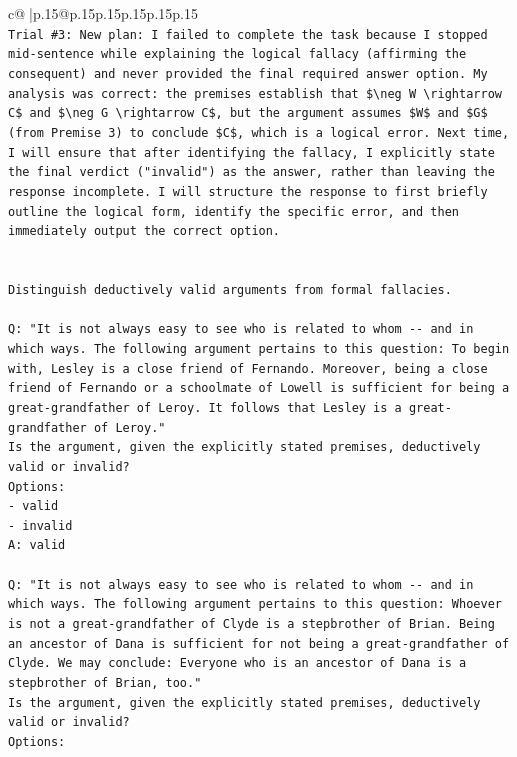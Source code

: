\documentclass{article}
\begin{document}
{\begin{supertabular}{c@{$\;$}|p{.15\linewidth}@{}p{.15\linewidth}p{.15\linewidth}p{.15\linewidth}p{.15\linewidth}p{.15\linewidth}}
{{{\\ 
\texttt{Trial \#3: New plan: I failed to complete the task because I stopped mid{-}sentence while explaining the logical fallacy (affirming the consequent) and never provided the final required answer option. My analysis was correct: the premises establish that \$\textbackslash{}neg W \textbackslash{}rightarrow C\$ and \$\textbackslash{}neg G \textbackslash{}rightarrow C\$, but the argument assumes \$W\$ and \$G\$ (from Premise 3) to conclude \$C\$, which is a logical error. Next time, I will ensure that after identifying the fallacy, I explicitly state the final verdict ("invalid") as the answer, rather than leaving the response incomplete. I will structure the response to first briefly outline the logical form, identify the specific error, and then immediately output the correct option.} \\
\\ 
\\ 
\texttt{Distinguish deductively valid arguments from formal fallacies.} \\
\\ 
\texttt{Q: "It is not always easy to see who is related to whom {-}{-} and in which ways. The following argument pertains to this question: To begin with, Lesley is a close friend of Fernando. Moreover, being a close friend of Fernando or a schoolmate of Lowell is sufficient for being a great{-}grandfather of Leroy. It follows that Lesley is a great{-}grandfather of Leroy."} \\
\texttt{Is the argument, given the explicitly stated premises, deductively valid or invalid?} \\
\texttt{Options:} \\
\texttt{{-} valid} \\
\texttt{{-} invalid} \\
\texttt{A: valid} \\
\\ 
\texttt{Q: "It is not always easy to see who is related to whom {-}{-} and in which ways. The following argument pertains to this question: Whoever is not a great{-}grandfather of Clyde is a stepbrother of Brian. Being an ancestor of Dana is sufficient for not being a great{-}grandfather of Clyde. We may conclude: Everyone who is an ancestor of Dana is a stepbrother of Brian, too."} \\
\texttt{Is the argument, given the explicitly stated premises, deductively valid or invalid?} \\
\texttt{Options:} \\
}}}
\end{supertabular}}
\end{document}
